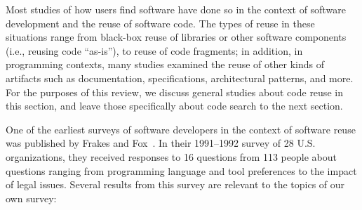 \documentclass{casicswhitepaper}
\begin{document}

Most studies of how users find software have done so in the context of software development and the reuse of software code.  The types of reuse in these situations range from black-box reuse of libraries or other software components (i.e., reusing code ``as-is''), to reuse of code fragments; in addition, in programming contexts, many studies examined the reuse of other kinds of artifacts such as documentation, specifications, architectural patterns, and more.  For the purposes of this review, we discuss general studies about code reuse in this section, and leave those specifically about code search to the next section.

One of the earliest surveys of software developers in the context of software reuse was published by Frakes and Fox~\cite{frakes1995sixteen}.  In their 1991--1992 survey of 28 U.S. organizations, they received responses to 16 questions from 113 people about questions ranging from programming language and tool preferences to the impact of legal issues.  Several results from this survey are relevant to the topics of our own survey:
\end{document}
